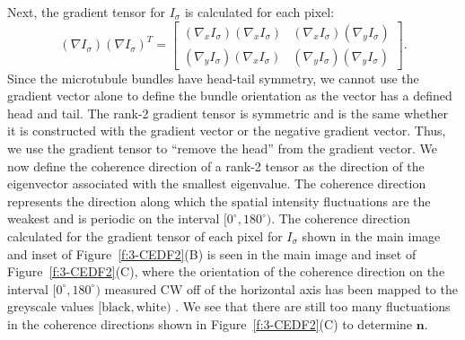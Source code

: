 Next, the gradient tensor for $I_{\sigma}$ is calculated for each pixel:
\begin{equation}
(\nabla I_{\sigma})(\nabla I_{\sigma})^T =
\begin{bmatrix}
(\nabla_x I_{\sigma})(\nabla_x I_{\sigma}) & (\nabla_x I_{\sigma})(\nabla_y I_{\sigma}) \\
(\nabla_y I_{\sigma})(\nabla_x I_{\sigma}) & (\nabla_y I_{\sigma})(\nabla_y I_{\sigma})
\end{bmatrix}.
\end{equation}
Since the microtubule bundles have head-tail symmetry, we cannot use the gradient vector alone to define the bundle orientation as the vector has a defined head and tail.
The rank-2 gradient tensor is symmetric and is the same whether it is constructed with the gradient vector or the negative gradient vector.
Thus, we use the gradient tensor to ``remove the head'' from the gradient vector.
We now define the coherence direction of a rank-2 tensor as the direction of the eigenvector associated with the smallest eigenvalue.
The coherence direction represents the direction along which the spatial intensity fluctuations are the weakest and is periodic on the interval $[0^{\circ}, 180^{\circ})$.
The coherence direction calculated for the gradient tensor of each pixel for $I_\sigma$ shown in the main image and inset of Figure~\ref{f:3-CEDF2}(B) is seen in the main image and inset of Figure~\ref{f:3-CEDF2}(C), where the orientation of the coherence direction on the interval $[0^{\circ}, 180^{\circ})$ measured CW off of the horizontal axis has been mapped to the greyscale values $[\textrm{black}, \textrm{white})$ .
We see that there are still too many fluctuations in the coherence directions shown in Figure~\ref{f:3-CEDF2}(C) to determine $\mathbf{n}$.

